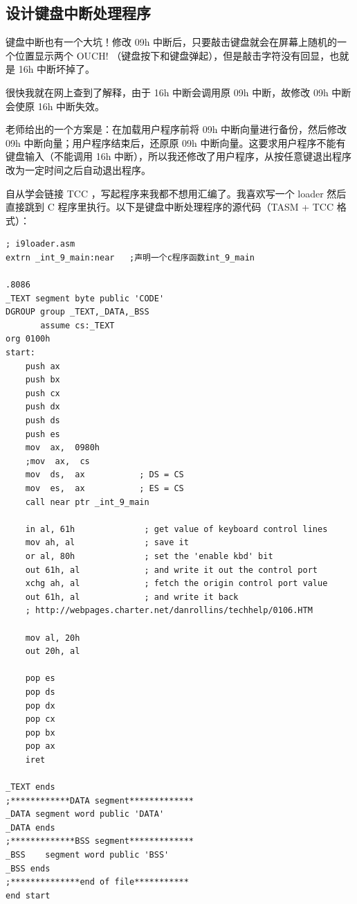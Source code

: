 \documentclass{article}
\begin{document}
\subsection{设计键盘中断处理程序}

键盘中断也有一个大坑！修改 09h 中断后，只要敲击键盘就会在屏幕上随机的一个位置显示两个 OUCH! （键盘按下和键盘弹起），但是敲击字符没有回显，也就是 16h 中断坏掉了。

很快我就在网上查到了解释，由于 16h 中断会调用原 09h 中断，故修改 09h 中断会使原 16h 中断失效。

老师给出的一个方案是：在加载用户程序前将 09h 中断向量进行备份，然后修改 09h 中断向量；用户程序结束后，还原原 09h 中断向量。这要求用户程序不能有键盘输入（不能调用 16h 中断），所以我还修改了用户程序，从按任意键退出程序改为一定时间之后自动退出程序。

自从学会链接 TCC ，写起程序来我都不想用汇编了。我喜欢写一个 loader 然后直接跳到 C 程序里执行。以下是键盘中断处理程序的源代码（TASM + TCC 格式）：

\begin{lstlisting}[language={[x86masm]Assembler}]
; i9loader.asm
extrn _int_9_main:near   ;声明一个c程序函数int_9_main

.8086
_TEXT segment byte public 'CODE'
DGROUP group _TEXT,_DATA,_BSS
       assume cs:_TEXT
org 0100h
start:
	push ax
	push bx
	push cx
	push dx
	push ds
	push es
	mov  ax,  0980h
	;mov  ax,  cs
	mov  ds,  ax           ; DS = CS
	mov  es,  ax           ; ES = CS
	call near ptr _int_9_main
	
	in al, 61h				; get value of keyboard control lines
	mov ah, al				; save it
	or al, 80h				; set the 'enable kbd' bit
	out 61h, al				; and write it out the control port
	xchg ah, al				; fetch the origin control port value
	out 61h, al				; and write it back
	; http://webpages.charter.net/danrollins/techhelp/0106.HTM
	
	mov al, 20h
	out 20h, al
	
	pop es
	pop ds
	pop dx
	pop cx
	pop bx
	pop ax
	iret

_TEXT ends
;************DATA segment*************
_DATA segment word public 'DATA'
_DATA ends
;*************BSS segment*************
_BSS	segment word public 'BSS'
_BSS ends
;**************end of file***********
end start
\end{lstlisting}
\end{document}
